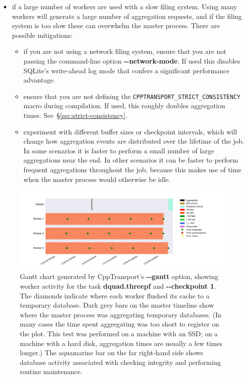 \documentclass[11pt,a4paper]{article}
\newcommand{\repoobject}[1]{{\ttfamily\bfseries\small #1}}
\newcommand{\packagefont}{\sffamily}
\newcommand{\CppTransport}{{\packagefont CppTransport}}
\newcommand{\SQLite}{{\packagefont SQLite}}
\newcommand{\option}[1]{{\ttfamily\bfseries\small #1}}
\begin{document}
\begin{itemize}
    \item if a large number of workers are used with a slow filing system.
    Using many workers will generate a large number of aggregation requests,
    and if the filing system is too slow these can overwhelm the master process.
    There are possible mitigations:
    \begin{itemize}
        \item if you are not using a network filing system, ensure that
        you are not passing the command-line option
        \option{{-}{-}network-mode}.
        If used this disables {\SQLite}'s write-ahead log mode that confers
        a significant performance advantage.
        
        \item ensure that you are not defining the
        \texttt{CPPTRANSPORT_STRICT_CONSISTENCY} macro during compilation.
        If used, this roughly doubles aggregation times.
        See~\S\ref{sec:strict-consistency}.
        
        \item experiment with different buffer sizes or checkpoint intervals,
        which will change how aggregation events
        are distributed over the lifetime of the job.
        In some scenarios it is faster to perform a small number of large aggregations
        near the end.
        In other scenarios it can be faster to perform frequent aggregations
        throughout the job, because this makes use of time when the master
        process would otherwise be idle.
    \end{itemize}
\end{itemize}
\begin{figure}
    \begin{center}
        \includegraphics[scale=0.5]{Outputs/gantt}    
    \end{center}
    \caption{\label{fig:gantt}Gantt chart
    generated by {\CppTransport}'s \option{{-}{-}gantt} option,
    showing worker activity
    for the task \repoobject{dquad.threepf}
    and \option{{-}{-}checkpoint 1}.
    The diamonds indicate where each worker flushed its cache
    to a temporary database.
    Dark grey bars on the master timeline show where the
    master process was aggregating temporary databases.
    (In many cases the time spent aggregating was too short to register
    on the plot. This test was performed on a machine with an SSD; on
    a machine with a hard disk, aggregation times are usually a few times longer.)
    The aquamarine bar on the far right-hand side
    shows database activity associated
    with checking integrity and performing routine maintenance.}
\end{figure}
\end{document}

